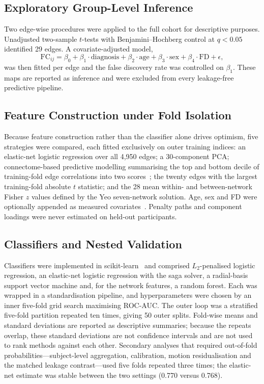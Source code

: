 \documentclass[runningheads]{llncs}
\begin{document}
\subsection{Exploratory Group-Level Inference}
Two edge-wise procedures were applied to the full cohort for descriptive purposes.
Unadjusted two-sample $t$-tests with Benjamini--Hochberg control at
$q < 0.05$~\cite{Benjamini1995} identified 29 edges. A covariate-adjusted model,
\begin{equation}
\mathrm{FC}_{ij} = \beta_0 + \beta_1 \cdot \mathrm{diagnosis} + \beta_2 \cdot
\mathrm{age} + \beta_3 \cdot \mathrm{sex} + \beta_4 \cdot \mathrm{FD} + \epsilon ,
\end{equation}
was then fitted per edge and the false discovery rate was controlled on $\beta_1$. These
maps are reported as inference and were excluded from every leakage-free predictive
pipeline.

\subsection{Feature Construction under Fold Isolation}
Because feature construction rather than the classifier alone drives optimism, five
strategies were compared, each fitted exclusively on outer training indices: an
elastic-net logistic regression over all 4,950 edges; a 30-component PCA;
connectome-based predictive modelling summarising the top and bottom decile of
training-fold edge correlations into two scores~\cite{Shen2017}; the twenty edges with
the largest training-fold absolute $t$ statistic; and the 28 mean within- and
between-network Fisher $z$ values defined by the Yeo seven-network solution. Age, sex and
FD were optionally appended as measured covariates~\cite{Power2012}. Penalty paths and
component loadings were never estimated on held-out participants.

\subsection{Classifiers and Nested Validation}
Classifiers were implemented in scikit-learn~\cite{Pedregosa2011} and comprised
$L_2$-penalised logistic regression, an elastic-net logistic regression with the saga
solver, a radial-basis support vector machine and, for the network features, a random
forest. Each was wrapped in a standardisation pipeline, and hyperparameters were chosen
by an inner five-fold grid search maximising ROC-AUC. The outer loop was a stratified
five-fold partition repeated ten times, giving 50 outer splits. Fold-wise means and
standard deviations are reported as descriptive summaries; because the repeats overlap,
these standard deviations are not confidence intervals and are not used to rank methods
against each other. Secondary analyses that required out-of-fold
probabilities---subject-level aggregation, calibration, motion residualisation and the
matched leakage contrast---used five folds repeated three times; the elastic-net estimate
was stable between the two settings (0.770 versus 0.768).
\end{document}
